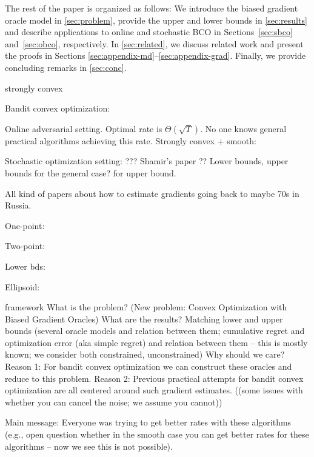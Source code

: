 
The rest of the paper is organized  as follows: We introduce the biased gradient oracle model in \cref{sec:problem}, provide the upper and lower bounds in \cref{sec:results} and describe applications to online and stochastic BCO in Sections~\ref{sec:sbco} and~\ref{sec:obco}, respectively. In \cref{sec:related}, we discuss related work and present the proofs in Sections \ref{sec:appendix-md}--\ref{sec:appendix-grad}. Finally, we provide concluding remarks in \cref{sec:conc}.




strongly convex


Bandit convex optimization:

Online adversarial setting. Optimal rate is $\Theta(\sqrt{T})$.
No one knows general practical algorithms achieving this rate.
Strongly convex + smooth: \cite{hazan2014bandit}

Stochastic optimization setting: ??? Shamir's paper \cite{shamir2012complexity}??
Lower bounds, upper bounds for the general case?
\cite{hazan2014bandit} for upper bound.

All kind of papers about how to estimate gradients going back to maybe 70s in Russia.

One-point: \cite{flaxman2005online}

Two-point: \cite{AgDeXi10}

Lower bds: \cite{raginsky2011information} \cite{Chen88:LB-AoS}

Ellipsoid: \cite{AgFoHsuKaRa13:SIAM}



 framework
What is the problem? (New problem: Convex Optimization with Biased Gradient Oracles)
What are the results? Matching lower and upper bounds (several oracle models and relation between them; cumulative regret and optimization error (aka simple regret) and relation between them -- this is mostly known; we consider both constrained, unconstrained)
Why should we care?
Reason 1: For bandit convex optimization we can construct these oracles and reduce to this problem.
Reason 2: Previous practical attempts for bandit convex optimization are all centered around such gradient estimates.
((some issues with whether you can cancel the noise; we assume you cannot))

Main message: Everyone was trying to get better rates with these algorithms (e.g., open question whether in the smooth case you can get better rates for these algorithms -- now we see this is not possible).
\fi
